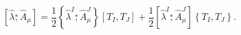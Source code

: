 \begin{equation}
\left[\widehat\lambda\stackrel{\ast}{,}\widehat{A}_{\mu}\right]=
\frac{1}{2}\left\{\widehat{\lambda}^{I}\stackrel{\ast}{,}\widehat{A}_{\mu}^{J}\right\} \left[
T_{I},T_{J}\right] +
\frac{1}{2}\left[ \widehat\lambda^{I}\stackrel{\ast}{,}\widehat{A}_{\mu}^{J}\right]
\left\{ T_{I},T_{J}\right\}.
\end{equation}

